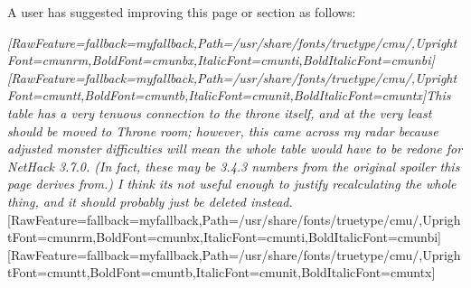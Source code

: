 {\begin{longtable}

\end{longtable}
}

A user has suggested improving this page or section as follows:


{\itshape \allowbreak{}\setmainfont{cmunti.ttf}[RawFeature={fallback=myfallback},Path=/usr/share/fonts/truetype/cmu/,UprightFont=cmunrm,BoldFont=cmunbx,ItalicFont=cmunti,BoldItalicFont=cmunbi]\setmonofont{cmunti.ttf}[RawFeature={fallback=myfallback},Path=/usr/share/fonts/truetype/cmu/,UprightFont=cmuntt,BoldFont=cmuntb,ItalicFont=cmunit,BoldItalicFont=cmuntx]\itshape {}This table has a very tenuous connection to the throne itself, and at the very least should be moved to Throne room\footnotemark[113]; however, this came across my radar because adjusted monster difficulties will mean the whole table would have to be redone for NetHack 3.7.0. (In fact, these may be 3.4.3 numbers from the original spoiler this page derives from.) I think it\textquotesingle{}s not useful enough to justify recalculating the whole thing, and it should probably just be deleted instead.}\allowbreak{}\setmainfont{cmunrm.ttf}[RawFeature={fallback=myfallback},Path=/usr/share/fonts/truetype/cmu/,UprightFont=cmunrm,BoldFont=cmunbx,ItalicFont=cmunti,BoldItalicFont=cmunbi]\setmonofont{cmunrm.ttf}[RawFeature={fallback=myfallback},Path=/usr/share/fonts/truetype/cmu/,UprightFont=cmuntt,BoldFont=cmuntb,ItalicFont=cmunit,BoldItalicFont=cmuntx]




